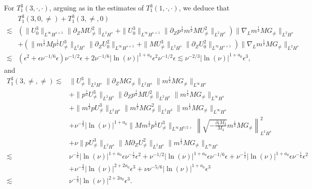 \documentclass[12pt]{article}
\numberwithin{equation}{section}
\begin{document}
	For $T^3_1(3,\cdot,\cdot)$, arguing as in the estimates of $T^3_1(1,\cdot,\cdot)$, we deduce that
	\begin{align*}
		&T^3_1(3,0,\neq)+T^3_1(3,\neq,0)\\
		\lesssim&(\|U^3_0\|_{L^\infty H^{s+1}}\|\partial_ZMU^2_{\neq}\|_{L^2H^s}+\|U^3_0\|_{L^\infty H^{s+1}}\|\partial_Zp^{\frac{1}{2}}m^{\frac{1}{2}}MU^2_{\neq}\|_{L^2H^s})\|\nabla_Lm^{\frac{1}{2}}MG_{\neq}\|_{L^2H^s}\\
		&+(\|m^{\frac{1}{2}}Mp^{\frac{1}{2}}U^3_{\neq}\|_{L^2H^s}\|\partial_ZU^2_0\|_{L^\infty H^{s+1}}+\|MU^3_{\neq}\|_{L^2H^s}\|\partial_ZU^2_0\|_{L^\infty H^{s+1}})\|\nabla_L m^{\frac{1}{2}}MG_{\neq}\|_{L^2H^s}\\
		\lesssim&(\epsilon^2+\epsilon\nu^{-1/6}\epsilon)\nu^{-1/2}\epsilon+2\nu^{-1/6}|\ln(\nu)|^{1+a_0}\epsilon^2\nu^{-1/2}\epsilon\lesssim\nu^{-2/3}|\ln(\nu)|^{1+a_0}\epsilon^3,
	\end{align*}
	and
	\begin{align*}
		T^3_1(3,\neq,\neq)\lesssim&\|U^3_{\neq}\|_{L^2H^s}\|\partial_ZMG_{\neq}\|_{L^2H^s}\|m^{\frac{1}{2}}MG_{\neq}\|_{L^\infty H^{s}}\\
		&+\|p^{\frac{1}{2}}U^3_{\neq}\|_{L^2H^s}\|\partial_Zp^{\frac{1}{2}}MU^2_{\neq}\|_{L^2H^s}\|m^{\frac{1}{2}}MG_{\neq}\|_{L^\infty H^{s}}\\
		&+\|m^{\frac{1}{2}}pU^3_{\neq}\|_{L^2H^s}\|m^{\frac{1}{2}}MG^2_{\neq}\|_{L^2H^3}\|m^{\frac{1}{2}}MG_{\neq}\|_{L^\infty H^{s}}\\
		&+\nu^{-\frac{2}{3}}|\ln(\nu)|^{1+a_0} \|Mm^{\frac12} p^{\frac12} U^3_{\neq}\|_{L^\infty H^{7/2+}}\left\|\sqrt{-\frac{\partial_tM_3}{M_3}}m^{\frac{1}{2}}MG_{\neq}\right\|^2_{L^2H^s}\\
		&+\nu\|p U^3_{\neq}\|_{L^2H^s}\|M\partial_ZU^2_{\neq}\|_{L^2H^s}\|m^{\frac{1}{2}}MG_{\neq}\|_{L^{\infty} H^{s}}\\
		\lesssim&\nu^{-\frac{1}{6}}|\ln(\nu)|^{1+a_0}\epsilon\nu^{-\frac{1}{2}}\epsilon^2+\nu^{-1/2}|\ln(\nu)|^{1+a_0}\epsilon\nu^{-1/6}\epsilon+\nu^{-\frac{1}{2}}|\ln(\nu)|^{1+a_0}\epsilon\nu^{-\frac{1}{6}}\epsilon^2\\
        &+\nu^{-\frac{2}{3}}|\ln(\nu)|^{2+2a_0}\epsilon^3+\nu\nu^{-5/6}|\ln(\nu)|^{1+a_0}\epsilon^3\\
		\lesssim&\nu^{-\frac{2}{3}}|\ln(\nu)|^{2+2a_0}\epsilon^3.
	\end{align*}
	
\end{document}
